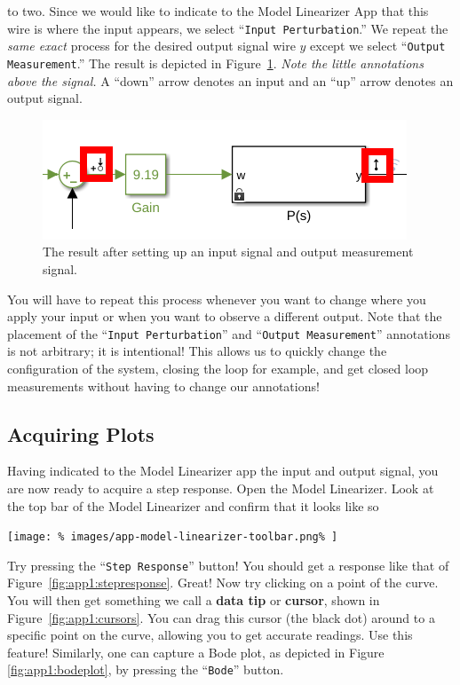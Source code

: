 to two.
Since we would like to indicate to the Model Linearizer App that this wire
is where the input appears, we select ``\texttt{Input Perturbation}.'' We
repeat the \emph{same exact} process for the desired output signal wire \(y\)
except we select ``\texttt{Output Measurement}.'' The result is
depicted in Figure~\ref{fig:app1:io-signals}. \emph{Note the little annotations
above the signal.}
A ``down'' arrow denotes an input and an ``up'' arrow denotes an output signal.
%
\begin{figure}
  \centering
  \includegraphics[width=0.8\linewidth]{images/app-model-linearizer-io-3.png}
  \caption{%
    The result after setting up an input signal and output
    measurement signal.%
  }
  \label{fig:app1:io-signals}
\end{figure}
%
You will have to repeat this process whenever you want to change where you
apply your input or when you want to observe a different output. Note that
the placement of the ``\texttt{Input Perturbation}'' and
``\texttt{Output Measurement}'' annotations is not arbitrary;
it is intentional! This
allows us to quickly change the configuration of the system, closing the loop
for example, and get closed loop measurements without having to change our
annotations!

\FloatBarrier
\subsection{Acquiring Plots}
\label{App:Simulink:ModelLinearizer:3}
Having indicated to the Model Linearizer app the input and output signal, you
are now ready to acquire a step response. Open the Model Linearizer. Look at
the top bar of the Model Linearizer and confirm that it looks like so
%
\begin{center}
  \texttt{[image: \%
    images/app-model-linearizer-toolbar.png\%
  ]}
\end{center}
%
Try pressing the ``\texttt{Step Response}'' button! You should get a response
like that of Figure~\ref{fig:app1:stepresponse}. Great! Now try clicking
on a point of the curve. You will then get something we call a \textbf{data
tip} or \textbf{cursor}, shown in Figure~\ref{fig:app1:cursors}.
You can drag this cursor (the black dot) around to a specific point on the
curve, allowing you to get accurate readings. Use this feature!
%
Similarly, one can capture a Bode plot, as depicted in Figure
\ref{fig:app1:bodeplot}, by pressing the ``\texttt{Bode}'' button.

